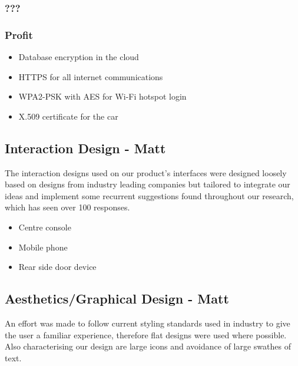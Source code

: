 \documentclass{article}
\begin{document}
\subsubsection{???}
\subsubsection{Profit}



\begin{itemize}
  \item Database encryption in the cloud
% 
% 
  \item HTTPS for all internet communications
  \item WPA2-PSK with AES for Wi-Fi hotspot login
  \item X.509 certificate for the car
\end{itemize}

\subsection{Interaction Design - Matt}\label{sssec:interaction-design}
The interaction designs used on our product's interfaces were designed loosely based on designs from industry leading companies but tailored to integrate our ideas and implement some recurrent suggestions found throughout our research, which has seen over 100 responses.

\begin{itemize}
  \item Centre console
  \item Mobile phone
  \item Rear side door device
\end{itemize}
\subsection{Aesthetics/Graphical Design - Matt}\label{ssec:aesthetics}
An effort was made to follow current styling standards used in industry to give the user a familiar experience, therefore flat designs were used where possible. Also characterising our design are large icons and avoidance of large swathes of text.
\end{document}
